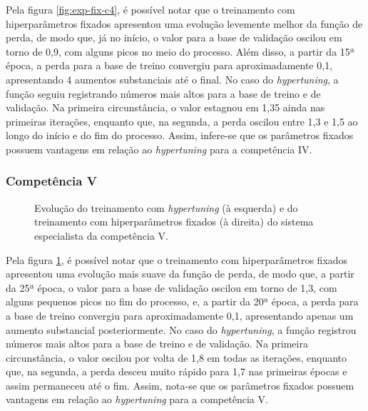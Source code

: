 Pela figura \ref{fig:exp-fix-c4}, é possível notar que o treinamento com hiperparâmetros fixados apresentou uma evolução levemente melhor da função de perda, de modo que, já no início, o valor para a base de validação oscilou em torno de 0,9, com alguns picos no meio do processo. Além disso, a partir da 15ª época, a perda para a base de treino convergiu para aproximadamente 0,1, apresentando 4 aumentos substanciais até o final. No caso do \textit{hypertuning}, a função seguiu registrando números mais altos para a base de treino e de validação. Na primeira circunstância, o valor estagnou em 1,35 ainda nas primeiras iterações, enquanto que, na segunda, a perda oscilou entre 1,3 e 1,5 ao longo do início e do fim do processo. Assim, infere-se que os parâmetros fixados possuem vantagens em relação ao \textit{hypertuning} para a competência IV.

\subsubsection{Competência V}
\label{subsec:exp-fix-c5}

\begin{figure}[H]
    \begin{minipage}{0.45\textwidth}
        \resizebox{\textwidth}{!}{}
    \end{minipage}
    \begin{minipage}{0.45\textwidth}
        \resizebox{\textwidth}{!}{}
    \end{minipage}

    \caption{Evolução do treinamento com \textit{hypertuning} (à esquerda) e do treinamento com hiperparâmetros fixados (à direita) do sistema especialista da competência V.}
    \label{fig:exp-fix-c5}
\end{figure}

Pela figura \ref{fig:exp-fix-c5}, é possível notar que o treinamento com hiperparâmetros fixados apresentou uma evolução mais suave da função de perda, de modo que, a partir da 25ª época, o valor para a base de validação oscilou em torno de 1,3, com alguns pequenos picos no fim do processo, e, a partir da 20ª época, a perda para a base de treino convergiu para aproximadamente 0,1, apresentando apenas um aumento substancial posteriormente. No caso do \textit{hypertuning}, a função registrou números mais altos para a base de treino e de validação. Na primeira circunstância, o valor oscilou por volta de 1,8 em todas as iterações, enquanto que, na segunda, a perda desceu muito rápido para 1,7 nas primeiras épocas e assim permaneceu até o fim. Assim, nota-se que os parâmetros fixados possuem vantagens em relação ao \textit{hypertuning} para a competência V.

